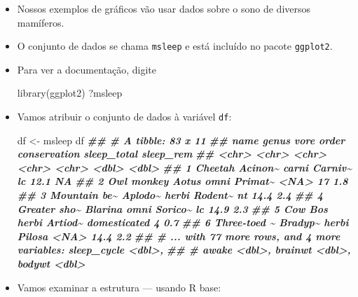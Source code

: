 \documentclass[
  11pt]{report}
\newenvironment{Shaded}{\begin{snugshade}}{\end{snugshade}}
\newcommand{\DocumentationTok}[1]{\textcolor[rgb]{0.56,0.35,0.01}{\textbf{\textit{#1}}}}
\newcommand{\FunctionTok}[1]{\textcolor[rgb]{0.00,0.00,0.00}{#1}}
\newcommand{\NormalTok}[1]{#1}
\newcommand{\OtherTok}[1]{\textcolor[rgb]{0.56,0.35,0.01}{#1}}
\renewenvironment{Shaded}{
  \begin{mdframed}[%
    roundcorner=2pt,%
    innerleftmargin=5pt,%
    innerrightmargin=5pt,%
    topline=true,%
    leftline=true,%
    rightline=true,%
    bottomline=true,%
    linewidth=0.5pt,%
    linecolor=black!20,%
    backgroundcolor=black!2,%
    skipabove=2ex,%
    skipbelow=2.5ex%
  ]%
}
{
  \end{mdframed}
}
\begin{document}
\begin{itemize}
\item
  Nossos exemplos de gráficos vão usar dados sobre o sono de diversos mamíferos.
\item
  O conjunto de dados se chama \texttt{msleep} e está incluído no pacote \texttt{ggplot2}.
\item
  Para ver a documentação, digite

\begin{Shaded}
\begin{Highlighting}[]
\FunctionTok{library}\NormalTok{(ggplot2)}
\NormalTok{?msleep}
\end{Highlighting}
\end{Shaded}
\item
  Vamos atribuir o conjunto de dados à variável \texttt{df}:

\begin{Shaded}
\begin{Highlighting}[]
\NormalTok{df }\OtherTok{\textless{}{-}}\NormalTok{ msleep}
\NormalTok{df}
\DocumentationTok{\#\# \# A tibble: 83 x 11}
\DocumentationTok{\#\#   name         genus   vore  order   conservation sleep\_total sleep\_rem}
\DocumentationTok{\#\#   \textless{}chr\textgreater{}        \textless{}chr\textgreater{}   \textless{}chr\textgreater{} \textless{}chr\textgreater{}   \textless{}chr\textgreater{}              \textless{}dbl\textgreater{}     \textless{}dbl\textgreater{}}
\DocumentationTok{\#\# 1 Cheetah      Acinon\textasciitilde{} carni Carniv\textasciitilde{} lc                  12.1      NA  }
\DocumentationTok{\#\# 2 Owl monkey   Aotus   omni  Primat\textasciitilde{} \textless{}NA\textgreater{}                17         1.8}
\DocumentationTok{\#\# 3 Mountain be\textasciitilde{} Aplodo\textasciitilde{} herbi Rodent\textasciitilde{} nt                  14.4       2.4}
\DocumentationTok{\#\# 4 Greater sho\textasciitilde{} Blarina omni  Sorico\textasciitilde{} lc                  14.9       2.3}
\DocumentationTok{\#\# 5 Cow          Bos     herbi Artiod\textasciitilde{} domesticated         4         0.7}
\DocumentationTok{\#\# 6 Three{-}toed \textasciitilde{} Bradyp\textasciitilde{} herbi Pilosa  \textless{}NA\textgreater{}                14.4       2.2}
\DocumentationTok{\#\# \# ... with 77 more rows, and 4 more variables: sleep\_cycle \textless{}dbl\textgreater{},}
\DocumentationTok{\#\# \#   awake \textless{}dbl\textgreater{}, brainwt \textless{}dbl\textgreater{}, bodywt \textless{}dbl\textgreater{}}
\end{Highlighting}
\end{Shaded}
\item
  Vamos examinar a estrutura --- usando R base:


\end{itemize}
\end{document}
